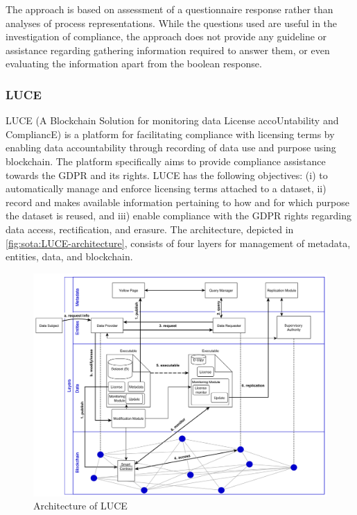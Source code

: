 The approach is based on assessment of a questionnaire response rather than analyses of process representations. While the questions used are useful in the investigation of compliance, the approach does not provide any guideline or assistance regarding gathering information required to answer them, or even evaluating the information apart from the boolean response.

\subsubsection{LUCE}
LUCE \cite{havelange_luce_2019} (A Blockchain Solution for monitoring data License accoUntability and CompliancE) is a platform for facilitating compliance with licensing terms by enabling data accountability through recording of data use and purpose using blockchain. The platform specifically aims to provide compliance assistance towards the GDPR and its rights. LUCE has the following objectives: (i) to automatically manage and enforce licensing terms attached to a dataset, ii) record and makes available information pertaining to how and for which purpose the dataset is reused, and iii) enable compliance with the GDPR rights regarding data access, rectification, and erasure. The architecture, depicted in \autoref{fig:sota:LUCE-architecture}, consists of four layers for management of metadata, entities, data, and blockchain. 
\begin{figure}[htbp]
    \centering
    \includegraphics[width=0.8\linewidth]{img/LUCE_architecture.png}
    \caption{Architecture of LUCE \cite{havelange_luce_2019}}
    \label{fig:sota:LUCE-architecture}
\end{figure}

